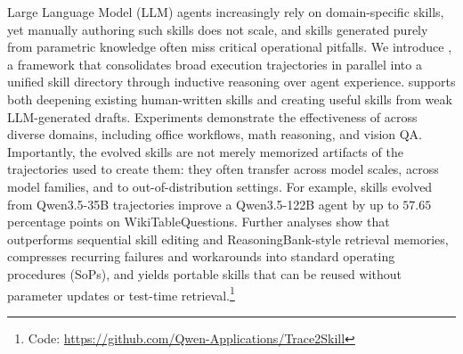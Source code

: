 


Large Language Model (LLM) agents increasingly rely on domain-specific skills, yet manually authoring such skills does not scale, and skills generated purely from parametric knowledge often miss critical operational pitfalls. We introduce \systemname{}, a framework that consolidates broad execution trajectories in parallel into a unified skill directory through inductive reasoning over agent experience. \systemname{} supports both deepening existing human-written skills and creating useful skills from weak LLM-generated drafts. Experiments demonstrate the effectiveness of \systemname{} across diverse domains, including office workflows, math reasoning, and vision QA. Importantly, the evolved skills are not merely memorized artifacts of the trajectories used to create them: they often transfer across model scales, across model families, and to out-of-distribution settings. For example, skills evolved from Qwen3.5-35B trajectories improve a Qwen3.5-122B agent by up to $57.65$ percentage points on WikiTableQuestions. Further analyses show that \systemname{} outperforms sequential skill editing and ReasoningBank-style retrieval memories, compresses recurring failures and workarounds into standard operating procedures (SoPs), and yields portable skills that can be reused without parameter updates or test-time retrieval.\footnote{Code: \url{https://github.com/Qwen-Applications/Trace2Skill}}

